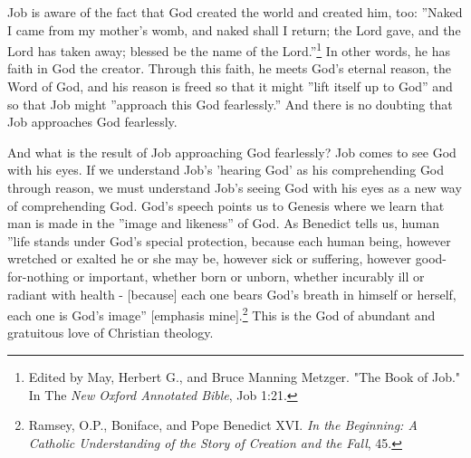 Job is aware of the fact that God created the world and created him, too: ''Naked I came from my mother's womb, and naked shall I return; the Lord gave, and the Lord has taken away; blessed be the name of the Lord.''\footnote{Edited by May, Herbert G., and Bruce Manning Metzger. "The Book of Job." In The \emph{New Oxford Annotated Bible}, Job 1:21.} In other words, he has faith in God the creator. Through this faith, he meets God's eternal reason, the Word of God, and his reason is freed so that it might ''lift itself up to God'' and so that Job might ''approach this God fearlessly.'' And there is no doubting that Job approaches God fearlessly.

And what is the result of Job approaching God fearlessly? Job comes to see God with his eyes. If we understand Job's 'hearing God' as his comprehending God through reason, we must understand Job's seeing God with his eyes as a new way of comprehending God. God's speech points us to Genesis where we learn that man is made in the ''image and likeness'' of God. As Benedict tells us, human ''life stands under God's special protection, because each human being, however wretched or exalted he or she may be, however sick or suffering, however good-for-nothing or important, whether born or unborn, whether incurably ill or radiant with health - [because] each one bears God's breath in himself or herself, each one is God's image'' [emphasis mine].\footnote{Ramsey, O.P., Boniface, and Pope Benedict XVI. \emph{In the Beginning: A Catholic Understanding of the Story of Creation and the Fall}, 45.} This is the God of abundant and gratuitous love of Christian theology.

